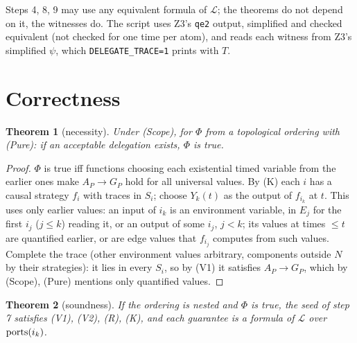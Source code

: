 \documentclass[10pt]{article}
\theoremstyle{tplain}\newtheorem{theorem}{Theorem}\newtheorem{lemma}[theorem]{Lemma}\newtheorem{proposition}[theorem]{Proposition}\newtheorem{corollary}[theorem]{Corollary}
\theoremstyle{tdef}\newtheorem{definition}[theorem]{Definition}
\begin{document}
Steps 4, 8, 9 may use any equivalent formula of $\mathcal L$; the theorems do not depend on it, the witnesses do. The script uses Z3's \texttt{qe2} output, simplified and checked equivalent (not checked for one time per atom), and reads each witness from Z3's simplified $\psi$, which \texttt{DELEGATE\_TRACE=1} prints with $T$.

\section{Correctness}
\begin{theorem}[necessity]\label{thm:nec}
Under (Scope), for $\Phi$ from a topological ordering with (Pure): if an acceptable delegation exists, $\Phi$ is true.
\end{theorem}
\begin{proof}
$\Phi$ is true iff functions choosing each existential timed variable from the earlier ones make $A_P\to G_P$ hold for all universal values. By (K) each $i$ has a causal strategy $f_i$ with traces in $S_i$; choose $Y_k(t)$ as the output of $f_{i_k}$ at $t$. This uses only earlier values: an input of $i_k$ is an environment variable, in $E_j$ for the first $i_j$ ($j\le k$) reading it, or an output of some $i_j$, $j<k$; its values at times $\le t$ are quantified earlier, or are edge values that $f_{i_j}$ computes from such values. Complete the trace (other environment values arbitrary, components outside $N$ by their strategies): it lies in every $S_i$, so by (V1) it satisfies $A_P\to G_P$, which by (Scope), (Pure) mentions only quantified values.
\end{proof}
\begin{theorem}[soundness]\label{thm:sound}
If the ordering is nested and $\Phi$ is true, the seed of step 7 satisfies (V1), (V2), (R), (K), and each guarantee is a formula of $\mathcal L$ over $\mathrm{ports}(i_k)$.
\end{theorem}
\end{document}
